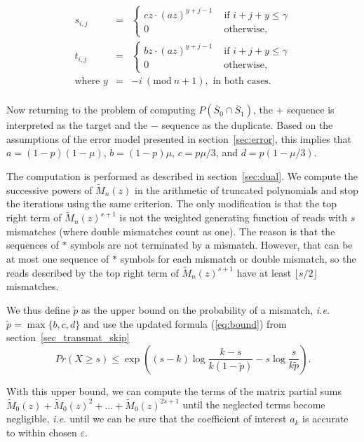 \documentclass{article}
\newcommand{\modulo}[1]{\ (\mathrm{mod}\ #1)}
\begin{document}
\begin{eqnarray*}
s_{i,j} &=&
  \begin{cases}
  cz \cdot (az)^{y+j-1} &\text{ if } i+j+y \leq \gamma \\
  0                     &\text{ otherwise,}
  \end{cases} \\
t_{i,j} &=&
  \begin{cases}
  bz \cdot (az)^{y+j-1} &\text{ if } i+j+y \leq \gamma \\
  0                     &\text{ otherwise,}
  \end{cases} \\
  \text{where } y &=& -i \modulo{n+1}, \text{ in both cases.} \\
\end{eqnarray*}

Now returning to the problem of computing $P(\overline{S}_0 \cap
\overline{S}_1)$, the $+$ sequence is interpreted as the target and the
$-$ sequence as the duplicate. Based on the assumptions of the error model
presented in section~\ref{sec:error}, this implies that $a =
(1-p)(1-\mu)$, $b = (1-p)\mu$, $c = p\mu/3$, and $d = p(1-\mu/3)$.

The computation is performed as described in section~\ref{sec:dual}. We
compute the successive powers of $\tilde{M}_n(z)$ in the arithmetic of
truncated polynomials and stop the iterations using the same criterion.
The only modification is that the top right term of $\tilde{M}_n(z)^{s+1}$
is not the weighted generating function of reads with $s$ mismatches
(where double mismatches count as one). The reason is that the sequences
of $*$ symbols are not terminated by a mismatch. However, that can be at
most one sequence of $*$ symbols for each mismatch or double mismatch, so
the reads described by the top right term of $\tilde{M}_n(z)^{s+1}$ have
at least $\lfloor s/2 \rfloor$ mismatches.

We thus define $\tilde{p}$ as the upper bound on the probability of a
mismatch, \textit{i.e.} $\tilde{p} = \max\{b,c,d\}$ and use the updated
formula (\ref{eq:bound}) from section~\ref{sec_transmat_skip}
\begin{equation*}
Pr(X \geq s) \leq \exp \left( (s-k)\log \frac{k-s}{k(1-\tilde{p})} -s\log
\frac{s}{k\tilde{p}} \right).
\end{equation*}

With this upper bound, we can compute the terms of the matrix partial sums
$\tilde{M}_0(z) + \tilde{M}_0(z)^2 + \ldots + \tilde{M}_0(z)^{2s+1}$ until
the neglected terms become negligible, \textit{i.e.} until we can be sure
that the coefficient of interest $a_k$ is accurate to within chosen
$\varepsilon$.
\end{document}
